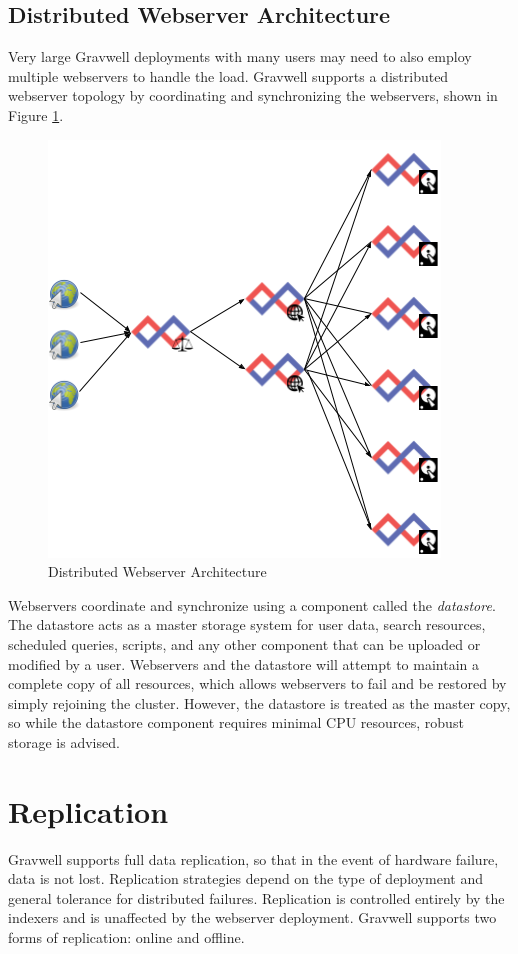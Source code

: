 {\subsection{Distributed Webserver Architecture}

Very large Gravwell deployments with many users may need to also employ
multiple webservers to handle the load. Gravwell supports a distributed
webserver topology by coordinating and synchronizing the webservers, 
shown in Figure \ref{fig:distributed}.

\begin{figure}[H]
	\includegraphics[width=0.6\linewidth]{images/distributed.png}
	\caption{Distributed Webserver Architecture}
	\label{fig:distributed}
\end{figure}

Webservers coordinate and synchronize using a component called the
\emph{datastore}. The datastore acts as a master storage system for user data,
search resources, scheduled queries, scripts, and any other component
that can be uploaded or modified by a user. Webservers and the
datastore will attempt to maintain a complete copy of all resources,
which allows webservers to fail and be restored by simply rejoining the
cluster. However, the datastore is treated as the master copy, so while
the datastore component requires minimal CPU resources, robust storage is advised.


\section{Replication}

Gravwell supports full data replication, so that in the event of
hardware failure, data is not lost. Replication strategies depend on
the type of deployment and general tolerance for distributed failures.
Replication is controlled entirely by the indexers and is unaffected by
the webserver deployment. Gravwell supports two forms of replication:
online and offline.

}

